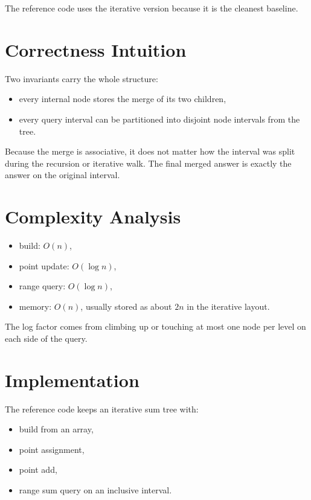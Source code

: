 The reference code uses the iterative version because it is the cleanest baseline.

\section*{Correctness Intuition}

Two invariants carry the whole structure:

\begin{itemize}
  \item every internal node stores the merge of its two children,
  \item every query interval can be partitioned into disjoint node intervals from the tree.
\end{itemize}

Because the merge is associative, it does not matter how the interval was split during the recursion or iterative
walk. The final merged answer is exactly the answer on the original interval.

\section*{Complexity Analysis}

\begin{itemize}
  \item build: \(O(n)\),
  \item point update: \(O(\log n)\),
  \item range query: \(O(\log n)\),
  \item memory: \(O(n)\), usually stored as about \(2n\) in the iterative layout.
\end{itemize}

The log factor comes from climbing up or touching at most one node per level on each side of the query.

\section*{Implementation}

The reference code keeps an iterative sum tree with:

\begin{itemize}
  \item build from an array,
  \item point assignment,
  \item point add,
  \item range sum query on an inclusive interval.
\end{itemize}

